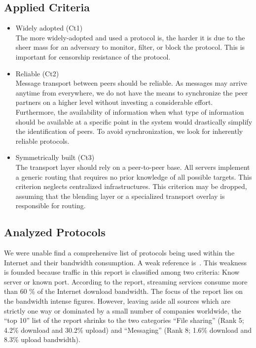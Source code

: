 \subsection{Applied Criteria\label{sec:transportCriteria}}
\begin{itemize}
	\item Widely adopted (Ct1)\\
	The more widely-adopted and used a protocol is, the harder it is due to the sheer mass for an adversary to monitor, filter, or block the protocol. This is important for censorship resistance of the protocol. 
	\item Reliable (Ct2)\\
	Message transport between peers should be reliable. As messages may arrive anytime from everywhere, we do not have the means to synchronize the peer partners on a higher level without investing a considerable effort. Furthermore, the availability of information when what type of information should be available at a specific point in the system would drastically simplify the identification of peers. To avoid synchronization, we look for inherently reliable protocols.
	\item Symmetrically built (Ct3)\\
	The transport layer should rely on a peer-to-peer base. All servers implement a generic routing that requires no prior knowledge of all possible targets. This criterion neglects centralized infrastructures. This criterion may be dropped, assuming that the blending layer or a specialized transport overlay is responsible for routing.
\end{itemize}

\subsection{Analyzed Protocols}
We were unable find a comprehensive list of protocols being used within the Internet and their bandwidth consumption. A weak reference is~\cite{zhou2011examining}. This weakness is founded because traffic in this report is classified among two criteria: Know server or known port. According to the report, streaming services consume more than 60 \% of the Internet download bandwidth. The focus of the report lies on the bandwidth intense figures. However, leaving aside all sources which are strictly one way or dominated by a small number of companies worldwide, the ``top 10'' list of the report shrinks to the two categories ``File sharing'' (Rank 5; 4.2\% download and 30.2\% upload) and ``Messaging'' (Rank 8; 1.6\% download and 8.3\% upload bandwidth). 

